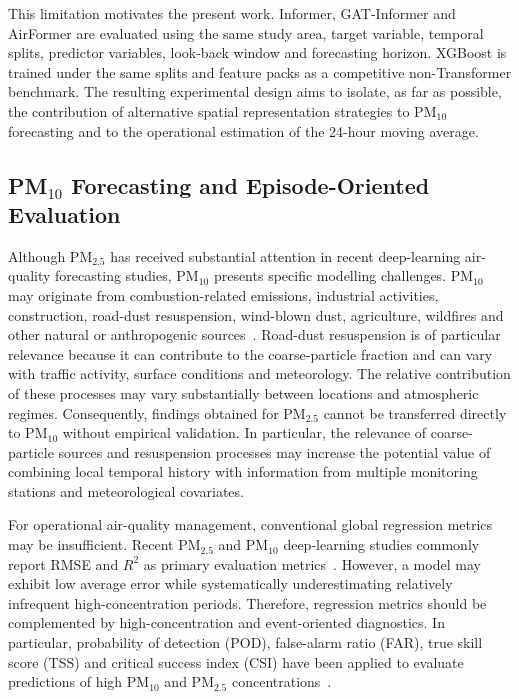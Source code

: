 \documentclass[11pt]{article}
\newenvironment{revnewblock}{%
  \begingroup\color{orange!75!black}%
}{%
  \endgroup%
}
\begin{document}
\begin{revnewblock}
This limitation motivates the present work. Informer, GAT-Informer and AirFormer are evaluated using the same study area, target variable, temporal splits, predictor variables, look-back window and forecasting horizon. XGBoost is trained under the same splits and feature packs as a competitive non-Transformer benchmark. The resulting experimental design aims to isolate, as far as possible, the contribution of alternative spatial representation strategies to PM$_{10}$ forecasting and to the operational estimation of the 24-hour moving average.

\subsection{PM$_{10}$ Forecasting and Episode-Oriented Evaluation}

Although PM$_{2.5}$ has received substantial attention in recent deep-learning air-quality forecasting studies, PM$_{10}$ presents specific modelling challenges. PM$_{10}$ may originate from combustion-related emissions, industrial activities, construction, road-dust resuspension, wind-blown dust, agriculture, wildfires and other natural or anthropogenic sources~\cite{Karagulian2015}. Road-dust resuspension is of particular relevance because it can contribute to the coarse-particle fraction and can vary with traffic activity, surface conditions and meteorology. The relative contribution of these processes may vary substantially between locations and atmospheric regimes. Consequently, findings obtained for PM$_{2.5}$ cannot be transferred directly to PM$_{10}$ without empirical validation. In particular, the relevance of coarse-particle sources and resuspension processes may increase the potential value of combining local temporal history with information from multiple monitoring stations and meteorological covariates.

For operational air-quality management, conventional global regression metrics may be insufficient. Recent PM$_{2.5}$ and PM$_{10}$ deep-learning studies commonly report RMSE and $R^2$ as primary evaluation metrics~\cite{Zhang2026X2AQFormer}. However, a model may exhibit low average error while systematically underestimating relatively infrequent high-concentration periods. Therefore, regression metrics should be complemented by high-concentration and event-oriented diagnostics. In particular, probability of detection (POD), false-alarm ratio (FAR), true skill score (TSS) and critical success index (CSI) have been applied to evaluate predictions of high PM$_{10}$ and PM$_{2.5}$ concentrations~\cite{Chae2021}.


\end{revnewblock}
\end{document}
